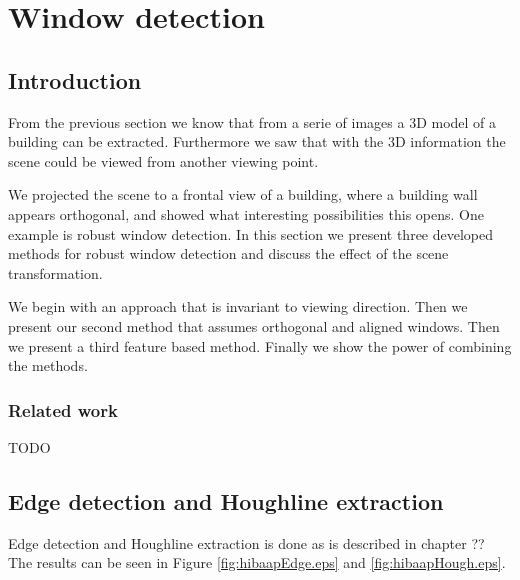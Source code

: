 %
%




\section{Window detection}







\label{chap:windowDetection}
\subsection{Introduction}
From the previous section we know that from a serie of images a 3D model of a
building can be extracted. Furthermore we saw that with the 3D information the
scene could be viewed from another viewing point. 

We projected the scene to a frontal view of a building, where a building wall appears
orthogonal, and showed what interesting possibilities this opens.
One example is robust window detection.
In this section we present three developed methods for robust window detection
and discuss the effect of the scene transformation.

We begin with an approach that is invariant to viewing direction.  Then we
present our second method that assumes orthogonal and aligned windows.  Then we
present a third feature based method.  Finally we show the power of combining
the methods.



\subsubsection{Related work}
TODO

\subsection{Edge detection and Houghline extraction} 
Edge detection and Houghline extraction is done as is described in chapter ??
The results can be seen in Figure \ref{fig:hibaapEdge.eps} and
\ref{fig:hibaapHough.eps}.
